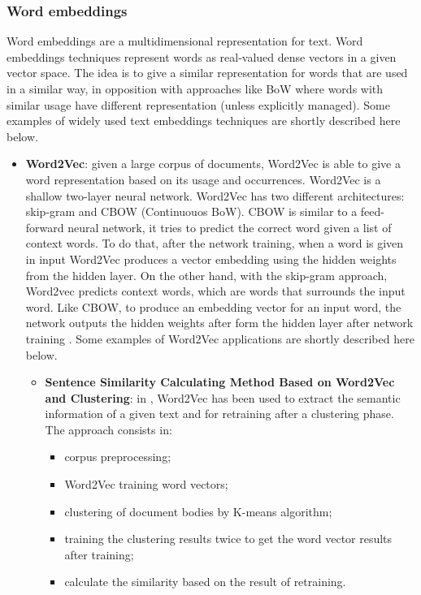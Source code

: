 \documentclass[\main/main.tex]{subfiles}
\begin{document}
\subsubsection{Word embeddings}
Word embeddings are a multidimensional representation for text. Word embeddings techniques represent words as real-valued dense vectors in a given vector space. The idea is to give a similar representation for words that are used in a similar way, in opposition with approaches like BoW where words with similar usage have different representation (unless explicitly managed). Some examples of widely used text embeddings techniques are shortly described here below.
\begin{itemize}
    \item \textbf{Word2Vec}: given a large corpus of documents, Word2Vec is able to give a word representation based on its usage and occurrences. Word2Vec is a shallow two-layer neural network. Word2Vec has two different architectures: skip-gram and CBOW (Continuouos BoW). CBOW is similar to a feed-forward neural network, it tries to predict the correct word given a list of context words. To do that, after the network training, when a word is given in input Word2Vec produces a vector embedding using the hidden weights from the hidden layer. On the other hand, with the skip-gram approach, Word2vec predicts context words, which are words that surrounds the input word. Like CBOW, to produce an embedding vector for an input word, the network outputs the hidden weights after form the hidden layer after network training \cite{mikolov2013efficient}. Some examples of Word2Vec applications are shortly described here below.
    \begin{itemize}
        \item \textbf{Sentence Similarity Calculating Method Based on Word2Vec and Clustering}: in \cite{Song2020SentenceSC}, Word2Vec has been used to extract the semantic information of a given text and for retraining after a clustering phase. The approach consists in: 
        \begin{itemize}
            \item corpus preprocessing;
            \item Word2Vec training word vectors;
            \item clustering of document bodies by K-means algorithm;
            \item training the clustering results twice to get the word vector results after training;
            \item calculate the similarity based on the result of retraining.

\end{itemize}
\end{itemize}
\end{itemize}
\end{document}
